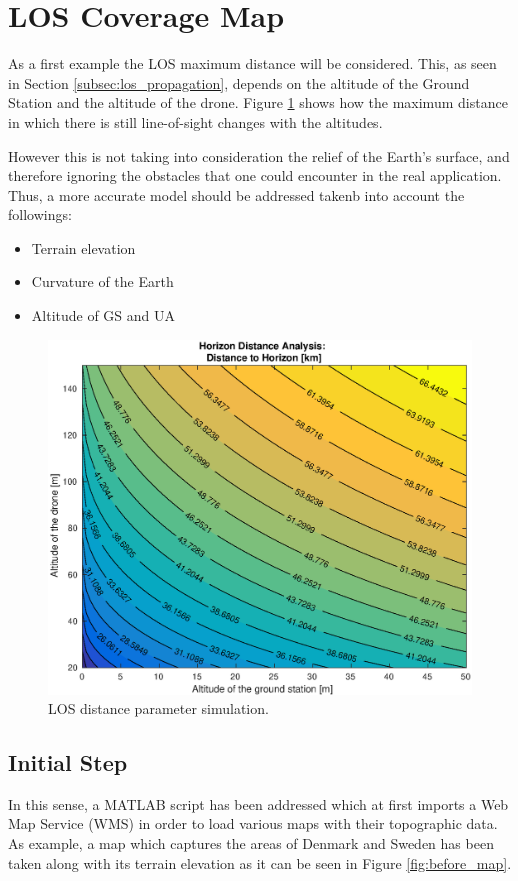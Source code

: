 \section{LOS Coverage Map}\label{sec:los_map}
As a first example the LOS maximum distance will be considered. This, as seen in Section \ref{subsec:los_propagation}, depends on the altitude of the Ground Station and the altitude of the drone. Figure \ref{fig:altitude2distance} shows how the maximum distance in which there is still line-of-sight changes with the altitudes.

However this is not taking into consideration the relief of the Earth's surface, and therefore ignoring the obstacles that one could encounter in the real application. Thus, a more accurate model should be addressed takenb into account the followings:

\begin{itemize}
  \item Terrain elevation
  \item Curvature of the Earth
  \item Altitude of GS and UA
\end{itemize}

\begin{figure}[H]
  \centering
  \includegraphics[scale=0.65]{figures/altitude2distance.eps}
  \caption{LOS distance parameter simulation.}
    \label{fig:altitude2distance}
\end{figure}

\subsection*{Initial Step}
In this sense, a MATLAB script has been addressed which at first imports a Web Map Service (WMS) in order to load various maps with their topographic data. As example, a map which captures the areas of Denmark and Sweden has been taken along with its terrain elevation as it can be seen in Figure \ref{fig:before_map}.

